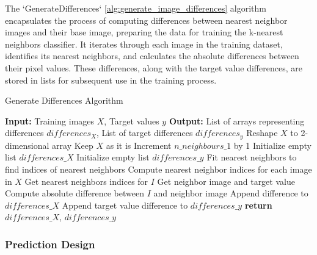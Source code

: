 \documentclass[a4paper, 12pt]{report}
\begin{document}
The `GenerateDifferences` \ref{alg:generate_image_differences} algorithm encapsulates the process of computing differences between nearest neighbor images and their base image, 
preparing the data for training the k-nearest neighbors classifier. It iterates through each image in the training dataset, identifies its nearest neighbors, 
and calculates the absolute differences between their pixel values. These differences, along with the target value differences, are stored in lists 
for subsequent use in the training process.
\begin{algorithm}
    \caption{Generate Differences Algorithm}
    \label{alg:generate_image_differences}
    \begin{algorithmic}
            \State \textbf{Input:} Training images $X$, Target values $y$
            \State \textbf{Output:} List of arrays representing differences $differences_X$, List of target differences $differences_y$
                \State Reshape $X$ to 2-dimensional array
            \Else
                \State Keep $X$ as it is
            \EndIf
            \State Increment $n\_neighbours\_1$ by 1 
            \State Initialize empty list $differences\_X$
            \State Initialize empty list $differences\_y$
            \State Fit nearest neighbors to find indices of nearest neighbors
            \State Compute nearest neighbor indices for each image in $X$
                \State Get nearest neighbors indices for $I$
                    \State Get neighbor image and target value
                    \State Compute absolute difference between $I$ and neighbor image
                    \State Append difference to $differences\_X$
                    \State Append target value difference to $differences\_y$
                \EndFor
            \EndFor
            \State \textbf{return} $differences\_X$, $differences\_y$
        \EndFunction
    \end{algorithmic}
\end{algorithm}
\clearpage

\subsubsection{Prediction Design}
\end{document}
